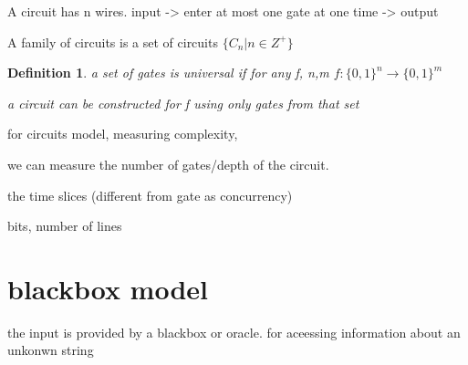 \documentclass[10pt]{article}
\theoremstyle{break}
\newtheorem{defn}{Definition}[subsection]
\begin{document}
 A circuit has n wires. input -> enter at most one gate at one time -> output

 A family of circuits is a set of circuits $\{C_n|n\in Z^+\}$

 \begin{defn}
     a set of gates is universal if for any f, n,m $f:\{0,1\}^n\rightarrow \{0,1\}^m$

     a circuit can be constructed for f using only gates from that set
 \end{defn}

 for circuits model, measuring complexity,

 we can measure the number of gates/depth of the circuit.

 the time slices (different from gate as concurrency)

 bits, number of lines

\section{blackbox model}
    the input is provided by a blackbox or oracle. for aceessing information 
    about an unkonwn string 
\end{document}
